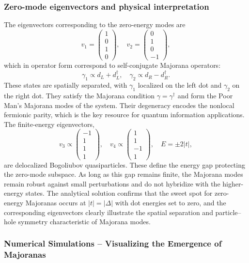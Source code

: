 \documentclass[11pt, letterpaper, titlepage]{article}
\begin{document}
\subsubsection{Zero-mode eigenvectors and physical interpretation}
The eigenvectors corresponding to the zero-energy modes are
\[
v_1 = \begin{pmatrix} 1 \\ 0 \\ 1 \\ 0 \end{pmatrix}, \quad
v_2 = \begin{pmatrix} 0 \\ 1 \\ 0 \\ -1 \end{pmatrix},
\]
which in operator form correspond to self-conjugate Majorana operators:
\[
\gamma_1 \propto d_L + d_L^\dagger, \quad
\gamma_2 \propto d_R - d_R^\dagger.
\]
These states are spatially separated, with \(\gamma_1\) localized on the left dot and \(\gamma_2\) on the right dot. They satisfy the Majorana condition \(\gamma = \gamma^\dagger\) and form the Poor Man's Majorana modes of the system. Their degeneracy encodes the nonlocal fermionic parity, which is the key resource for quantum information applications.
The finite-energy eigenvectors,
\[
v_3 \propto \begin{pmatrix}-1 \\ 1 \\ 1 \\ 1\end{pmatrix}, \quad
v_4 \propto \begin{pmatrix}1 \\ 1 \\ -1 \\ 1\end{pmatrix}, \quad
E = \pm 2|t|,
\]
are delocalized Bogoliubov quasiparticles. These define the energy gap protecting the zero-mode subspace. As long as this gap remains finite, the Majorana modes remain robust against small perturbations and do not hybridize with the higher-energy states.
The analytical solution confirms that the sweet spot for zero-energy Majoranas occurs at \(|t| = |\Delta|\) with dot energies set to zero, and the corresponding eigenvectors clearly illustrate the spatial separation and particle–hole symmetry characteristic of Majorana modes.

\subsubsection{Numerical Simulations – Visualizing the Emergence of Majoranas}
\end{document}
